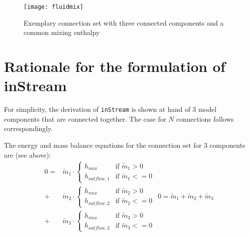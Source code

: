 \begin{figure}[H]
\caption{Exemplary connection set with three connected components and a common mixing enthalpy}
\begin{center}
\texttt{[image: fluidmix]}
\end{center}
\end{figure}

\section{Rationale for the formulation of inStream}\label{rationale-for-the-formulation-of-the-instream-operator}

For simplicity, the derivation of \lstinline!inStream! is shown at hand of 3 model components that are connected together.
The case for $N$ connections follows correspondingly.

The energy and mass balance equations for the connection set for 3
components are (see above):
\begin{subequations}
\begin{equation}
\begin{split}
0=&\tilde{m}_1\cdot
\begin{cases}
h_{mix}&\text{if $\tilde{m}_1>0$}\\
h_{outflow,1}&\text{if $\tilde{m}_1<=0$}
\end{cases}\\
+&\tilde{m}_2\cdot
\begin{cases}
h_{mix}&\text{if $\tilde{m}_2>0$}\\
h_{outflow,2}&\text{if $\tilde{m}_2<=0$}
\end{cases}\\
+&\tilde{m}_3\cdot
\begin{cases}
h_{mix}&\text{if $\tilde{m}_3>0$}\\
h_{outflow,3}&\text{if $\tilde{m}_3<=0$}
\end{cases}
\end{split}
\label{eq:D1a}
\end{equation}
\begin{equation}
0=\tilde{m}_1+\tilde{m}_2+\tilde{m}_3
\label{eq:D1b}
\end{equation}
\label{eq:D1}
\end{subequations}

